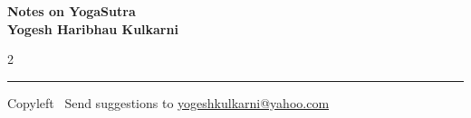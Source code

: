 \documentclass[9pt,a4paper,landscape]{article}
\begin{document}
\footnotesize


\begin{center}
\Large{\textbf{Notes on YogaSutra\\ Yogesh Haribhau Kulkarni}}  
\end{center}

\begin{multicols}{2}

\end{multicols}

\rule{\linewidth}{0.25pt}
\scriptsize
Copyleft \textcopyleft\  Send suggestions to 
\href{http://www.yogeshkulkarni.com}{yogeshkulkarni@yahoo.com}
\end{document}
